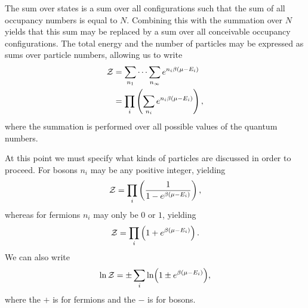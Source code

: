 The sum over states is a sum over all configurations such that the sum of all occupancy numbers is equal to $N$. Combining this with the summation over $N$ yields that this sum may be replaced by a sum over all conceivable occupancy configurations. The total energy and the number of particles may be expressed as sums over particle numbers, allowing us to write
\begin{align*}
	\mathcal{Z} &= \sum\limits_{n_{1}}\dots\sum\limits_{n_{\infty}}e^{n_{i}\beta(\mu - E_{i})} \\
	   &= \prod\limits_{i}\left(\sum\limits_{n_{i}}e^{n_{i}\beta(\mu - E_{i})}\right),
\end{align*}
where the summation is performed over all possible values of the quantum numbers.

At this point we must specify what kinds of particles are discussed in order to proceed. For bosons $n_{i}$ may be any positive integer, yielding
\begin{align*}
	\mathcal{Z} = \prod\limits_{i}\left(\frac{1}{1 - e^{\beta(\mu - E_{i})}}\right),
\end{align*}
whereas for fermions $n_{i}$ may only be $0$ or $1$, yielding
\begin{align*}
	\mathcal{Z} = \prod\limits_{i}\left(1 + e^{\beta(\mu - E_{i})}\right).
\end{align*}
We can also write
\begin{align*}
	\ln{\mathcal{Z}} = \pm\sum\limits_{i}\ln(1 \pm e^{\beta(\mu - E_{i})}),
\end{align*}
where the $+$ is for fermions and the $-$ is for bosons.

